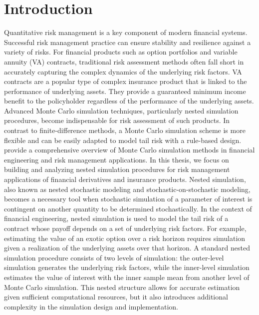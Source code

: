 \chapter{Introduction}

Quantitative risk management is a key component of modern financial systems.
Successful risk management practice can ensure stability and resilience against a variety of risks.
For financial products such as option portfolios and variable annuity (VA) contracts, traditional risk assessment methods often fall short in accurately capturing the complex dynamics of the underlying risk factors.
VA contracts are a popular type of complex insurance product that is linked to the performance of underlying assets.
They provide a guaranteed minimum income benefit to the policyholder regardless of the performance of the underlying assets.
Advanced Monte Carlo simulation techniques, particularly nested simulation procedures, become indispensable for risk assessment of such products.
In contrast to finite-difference methods, a Monte Carlo simulation scheme is more flexible and can be easily adapted to model tail risk with a rule-based design.
~\cite{glasserman2004monte} provide a comprehensive overview of Monte Carlo simulation methods in financial engineering and risk management applications.
In this thesis, we focus on building and analyzing nested simulation procedures for risk management applications of financial derivatives and insurance products.
Nested simulation, also known as nested stochastic modeling and stochastic-on-stochastic modeling, becomes a necessary tool when stochastic simulation of a parameter of interest is contingent on another quantity to be determined stochastically.
In the context of financial engineering, nested simulation is used to model the tail risk of a contract whose payoff depends on a set of underlying risk factors.
For example, estimating the value of an exotic option over a risk horizon requires simulation given a realization of the underlying assets over that horizon.
A standard nested simulation procedure consists of two levels of simulation: the outer-level simulation generates the underlying risk factors, while the inner-level simulation estimates the value of interest with the inner sample mean from another level of Monte Carlo simulation.
This nested structure allows for accurate estimation given sufficient computational resources, but it also introduces additional complexity in the simulation design and implementation.
